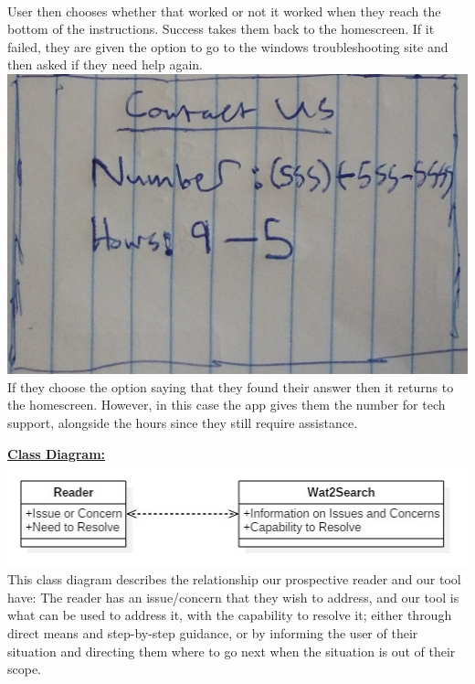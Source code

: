 \documentclass[12pt, letterpaper]{article}
\begin{document}
\begin{enumerate}
	\\User then chooses whether that worked or not it worked when they reach the bottom of the instructions. Success takes them back to the homescreen. If it failed, they are given the option to go to the windows troubleshooting site and then asked if they need help again. 
	\\\includegraphics[scale=.075]{contact_us.jpg}
	\\If they choose the option saying that they found their answer then it returns to the homescreen. However, in this case the app gives them the number for tech support, alongside the hours since they still require assistance.  
	\\
\end{enumerate}	
\underline{\textbf{Class Diagram:}}
\\\includegraphics[scale=.75]{class_diagram.png}
\\This class diagram describes the relationship our prospective reader and our tool have: The reader has an issue/concern that they wish to address, and our tool is what can be used to address it, with the capability to resolve it; either through direct means and step-by-step guidance, or by informing the user of their situation and directing them where to go next when the situation is out of their scope.
\\\\\\\\
\end{document}
